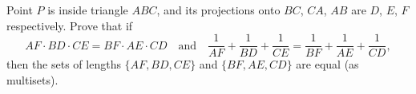 Point $P$ is inside triangle $ABC$, and its projections onto $BC$, $CA$, $AB$ are $D$, $E$, $F$ respectively. Prove that if
\[AF\cdot BD\cdot CE=BF\cdot AE\cdot CD\quad\text{and}\quad\dfrac1{AF}+\dfrac1{BD}+\dfrac1{CE}=\dfrac1{BF}+\dfrac1{AE}+\dfrac1{CD},\]
then the sets of lengths $\{AF,BD,CE\}$ and $\{BF,AE,CD\}$ are equal (as multisets).
